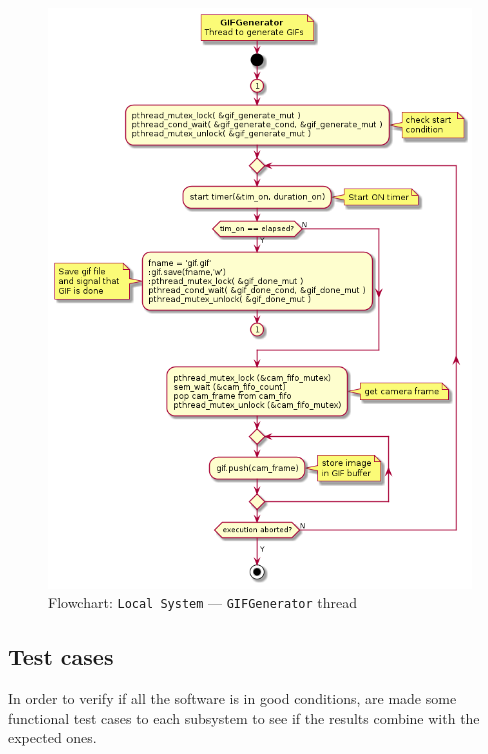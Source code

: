 \begin{figure}[htb!]
\centering
    \includegraphics[width=0.6\columnwidth]{./img/flow-local-gif-gen.png}
  \caption{Flowchart: \texttt{Local System} --- \texttt{GIFGenerator} thread}%
\label{fig:flow-local-gif-gen}
\end{figure}


\subsection{Test cases}
\label{sec:sw-test-cases}
In order to verify if all the software is in good conditions, are made some functional test cases to each subsystem to see if the results combine with the expected ones.

